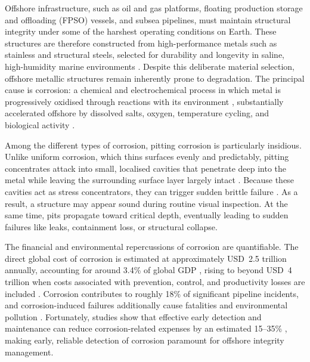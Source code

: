 \documentclass[conference]{IEEEtran}
\begin{document}
Offshore infrastructure, such as oil and gas platforms, floating production storage and offloading (FPSO) vessels, and subsea pipelines, must maintain structural integrity under some of the harshest operating conditions on Earth. These structures are therefore constructed from high-performance metals such as stainless and structural steels, selected for durability and longevity in saline, high-humidity marine environments \cite{dalmora2025methods}. Despite this deliberate material selection, offshore metallic structures remain inherently prone to degradation. The principal cause is corrosion: a chemical and electrochemical process in which metal is progressively oxidised through reactions with its environment \cite{balangao2024corrosion}, substantially accelerated offshore by dissolved salts, oxygen, temperature cycling, and biological activity \cite{dalmora2025methods,bakdash2026analytical}.

Among the different types of corrosion, pitting corrosion is particularly insidious. Unlike uniform corrosion, which thins surfaces evenly and predictably, pitting concentrates attack into small, localised cavities that penetrate deep into the metal while leaving the surrounding surface layer largely intact \cite{balangao2024corrosion}. Because these cavities act as stress concentrators, they can trigger sudden brittle failure \cite{olawole2026advanced}. As a result, a structure may appear sound during routine visual inspection. At the same time, pits propagate toward critical depth, eventually leading to sudden failures like leaks, containment loss, or structural collapse.

The financial and environmental repercussions of corrosion are quantifiable. The direct global cost of corrosion is estimated at approximately USD~2.5 trillion annually, accounting for around 3.4\% of global GDP \cite{kahkesh2025algae, imran2025ship}, rising to beyond USD~4 trillion when costs associated with prevention, control, and productivity losses are included \cite{bakdash2026analytical}. Corrosion contributes to roughly 18\% of significant pipeline incidents, and corrosion-induced failures additionally cause fatalities and environmental pollution \cite{olawole2026advanced, dalmora2025methods}. Fortunately, studies show that effective early detection and maintenance can reduce corrosion-related expenses by an estimated 15--35\% \cite{kahkesh2025algae, imran2025ship}, making early, reliable detection of corrosion paramount for offshore integrity management.
\end{document}
